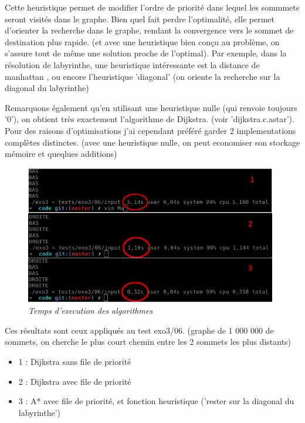 \documentclass[10pt]{article}
\begin{document}
			Cette heuristique permet de modifier l'ordre de priorité dans lequel les sommmets seront visités dans le graphe.
			Bien quel fait perdre l'optimalité, elle permet d'orienter la recherche dans le graphe, rendant la convergence vers
			le sommet de destination plus rapide.
			(et avec une heuristique bien conçu au problème, on s'assure tout de même une solution proche de l'optimal).
			Par exemple, dans la résolution de labyrinthe, une heuristique intéressante est la distance de manhattan \cite{manhattan},
			ou encore l'heuristique 'diagonal' (on oriente la recherche sur la diagonal du labyrinthe)
			
			Remarquons également qu'en utilisant une heuristique nulle (qui renvoie toujours '0'),
			on obtient très exactement l'algorithme de Dijkstra. (voir 'dijkstra.c.astar').
			Pour des raisons d'optimisations j'ai cependant préféré garder 2 implementations complètes distinctes.
			(avec une heuristique nulle, on peut economiser son stockage mémoire et queqlues additions)
	
			\begin{figure}[H]
				\begin{center}
					\includegraphics[width=11cm,height=\textheight,keepaspectratio]{./images/performances.png}
				\end{center}
				\caption{\textit{Temps d'execution des algorithmes}}
			\end{figure}
			
			Ces résultats sont ceux appliqués au test exo3/06. (graphe de 1 000 000 de sommets,
			on cherche le plus court chemin entre les 2 sommets les plus distants)
			
			\begin{itemize}[label=-]
				\setlength\itemsep{0.1em}
				\item 1 : Dijkstra sans file de priorité
				\item 2 : Dijkstra avec file de priorité
				\item 3 : A* avec file de priorité, et fonction heuristique ('rester sur la diagonal du labyrinthe')
			\end{itemize}
			
\end{document}
